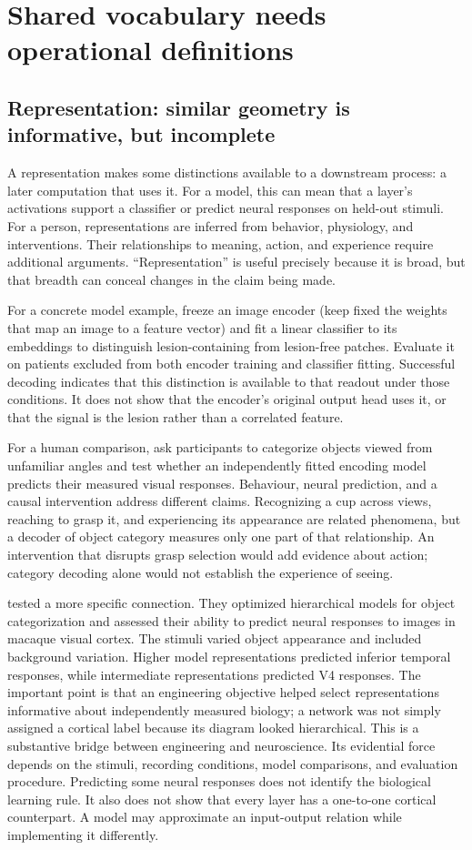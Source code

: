 \documentclass[11pt,a4paper]{article}
\begin{document}
\section{Shared vocabulary needs operational definitions}\label{sec:vocabulary}
\subsection{Representation: similar geometry is informative, but incomplete}
A representation makes some distinctions available to a downstream process: a later computation that uses it. For a model, this can mean that a layer's activations support a classifier or predict neural responses on held-out stimuli. For a person, representations are inferred from behavior, physiology, and interventions. Their relationships to meaning, action, and experience require additional arguments. ``Representation'' is useful precisely because it is broad, but that breadth can conceal changes in the claim being made.

For a concrete model example, freeze an image encoder (keep fixed the weights that map an image to a feature vector) and fit a linear classifier to its embeddings to distinguish lesion-containing from lesion-free patches. Evaluate it on patients excluded from both encoder training and classifier fitting. Successful decoding indicates that this distinction is available to that readout under those conditions. It does not show that the encoder's original output head uses it, or that the signal is the lesion rather than a correlated feature.

For a human comparison, ask participants to categorize objects viewed from unfamiliar angles and test whether an independently fitted encoding model predicts their measured visual responses. Behaviour, neural prediction, and a causal intervention address different claims. Recognizing a cup across views, reaching to grasp it, and experiencing its appearance are related phenomena, but a decoder of object category measures only one part of that relationship. An intervention that disrupts grasp selection would add evidence about action; category decoding alone would not establish the experience of seeing.

\citet{yamins2014} tested a more specific connection. They optimized hierarchical models for object categorization and assessed their ability to predict neural responses to images in macaque visual cortex. The stimuli varied object appearance and included background variation. Higher model representations predicted inferior temporal responses, while intermediate representations predicted V4 responses. The important point is that an engineering objective helped select representations informative about independently measured biology; a network was not simply assigned a cortical label because its diagram looked hierarchical. This is a substantive bridge between engineering and neuroscience. Its evidential force depends on the stimuli, recording conditions, model comparisons, and evaluation procedure. Predicting some neural responses does not identify the biological learning rule. It also does not show that every layer has a one-to-one cortical counterpart. A model may approximate an input-output relation while implementing it differently.
\end{document}
